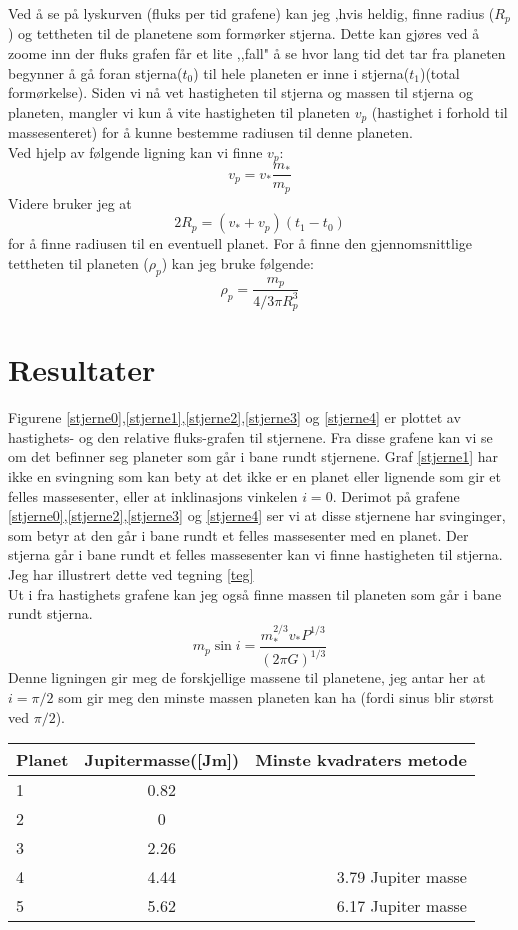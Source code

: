 \documentclass[12pt,preprint]{aastex6}
\begin{document}
Ved å se på lyskurven (fluks per tid grafene) kan jeg ,hvis heldig, finne radius ($R_p$) og tettheten til de planetene som formørker stjerna. Dette kan gjøres ved å zoome inn der fluks grafen får et lite ,,fall" å se hvor lang tid det tar fra planeten begynner å gå foran stjerna($t_0$) til hele planeten er inne i stjerna($t_1$)(total formørkelse). Siden vi nå vet hastigheten til stjerna og massen til stjerna og planeten, mangler vi kun å vite hastigheten til planeten $v_p$ (hastighet i forhold til massesenteret) for å kunne bestemme radiusen til denne planeten.\\ 
Ved hjelp av følgende ligning kan vi finne $v_p$:
$$v_p = v_*\frac{m_*}{m_p} $$
Videre bruker jeg at
$$ 2R_p = (v_*+v_p)(t_1-t_0)$$
for å finne radiusen til en eventuell planet. For å finne den gjennomsnittlige tettheten til planeten ($\rho_p$) kan jeg bruke følgende:
$$\rho_p = \frac{m_p}{4/3\pi R_p^3} $$




\section{Resultater}
Figurene \ref{stjerne0},\ref{stjerne1},\ref{stjerne2},\ref{stjerne3} og \ref{stjerne4} er plottet av hastighets- og den relative fluks-grafen til stjernene. Fra disse grafene kan vi se om det befinner seg planeter som går i bane rundt stjernene. Graf \ref{stjerne1} har ikke en svingning som kan bety at det ikke er en planet eller lignende som gir et felles massesenter, eller at inklinasjons vinkelen $i = 0$. Derimot på grafene \ref{stjerne0},\ref{stjerne2},\ref{stjerne3} og \ref{stjerne4} ser vi at disse stjernene har svinginger, som betyr at den går i bane rundt et felles massesenter med en planet. Der stjerna går i bane rundt et felles massesenter kan vi finne hastigheten til stjerna. Jeg har illustrert dette ved tegning \ref{teg}\\

Ut i fra hastighets grafene kan jeg også finne massen til planeten som går i bane rundt stjerna. 
$$m_p\sin i = \frac{m_*^{2/3}v_*P^{1/3}}{(2\pi G)^{1/3}}$$
Denne ligningen gir meg de forskjellige massene til planetene, jeg antar her at $i=\pi /2$ som gir meg den minste massen planeten kan ha (fordi sinus blir størst ved $\pi /2$). 

\begin{center}
  \begin{tabular}{ | l | c | r |}
    \hline
    Planet & Jupitermasse([Jm]) & Minste kvadraters metode\\ \hline
    1 & 0.82 & \\ \hline
    2 & 0 & \\ \hline
    3 & 2.26 & \\ \hline
    4 & 4.44 & 3.79 Jupiter masse\\ \hline
    5 & 5.62 & 6.17 Jupiter masse\\
    \hline
  \end{tabular}
\end{center}
\end{document}
